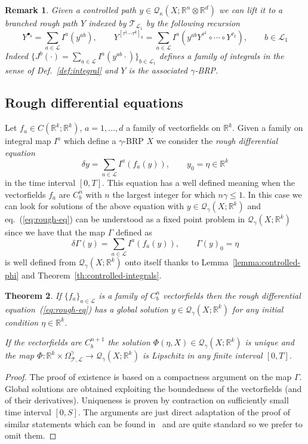 \documentclass[a4paper,11pt,reqno]{article}
\newcommand{\1}{{\bf 1}}
\newcommand{\der}{\delta}
\newcommand{\RR}{\mathbb{R}}
\newcommand{\QQ}{\mathcal{Q}}
\newcommand{\LL}{\mathcal{L}}
\newtheorem{theorem}{Theorem}[section]
\newtheorem{remark}[theorem]{Remark}
\newcommand{\TT}{\mathcal{T}}
\newcommand{\troot}{\bullet}
\begin{document}
\begin{remark}
Given a controlled path $y \in \QQ_\kappa(X;\RR^n\otimes \RR^d)$ we can lift it to  a branched rough path $Y$ indexed by $\TT_{\LL_1}$ by the following recursion
$$
Y^{\troot_b} = \sum_{a \in \LL} I^a(y^{ab}), \qquad
Y^{[\tau^1 \cdots \tau^k]_b} = \sum_{a \in \LL} I^a(y^{ab} Y^{\tau^1}\circ \cdots \circ  Y^{\tau_k}), \qquad b \in \LL_1 
$$  
Indeed $\{ J^b(\cdot) = \sum_{a\in\LL}I^a(y^{ab} \cdot)\}_{b \in \LL_1}$ defines a family  of integrals in the sense of Def.~\ref{def:integral} and $Y$ is the associated $\gamma$-BRP.
\end{remark}

\subsection{Rough differential equations}

Let $f_a \in C(\RR^k;\RR^k)$, $a=1,\dots,d$ a family of vectorfields on $\RR^k$. Given a family on integral map $I^a$ which define a $\gamma$-BRP $X$ we consider the \emph{rough differential equation}
\begin{equation}
  \label{eq:rough-eq}
\der y = \sum_{a\in\LL} I^a(f_a(y)), \qquad y_0 = \eta \in \RR^k  
\end{equation}
in the time interval $[0,T]$. This equation has a well defined meaning
when the vectorfields $f_a$ are $C^n_b$ with $n$ the largest integer
for which $n\gamma \le 1$. In this case we can look for solutions
of the above equation with $y \in \QQ_\gamma(X;\RR^k)$ and
eq.~(\ref{eq:rough-eq}) can be understood as a fixed point problem in
$\QQ_\gamma(X;\RR^k)$ since we have that the map $\Gamma$ defined as
$$
\der \Gamma(y) = \sum_{a\in\LL} I^a(f_a(y)), \qquad \Gamma(y)_0 = \eta
$$ 
is well defined from $\QQ_\gamma(X;\RR^k)$ onto itself thanks to
Lemma~\ref{lemma:controlled-phi} and  Theorem~\ref{th:controlled-integrals}.

\begin{theorem}
If $\{f_a\}_{a\in\LL}$ is a family of $C^{n}_b$ vectorfields then
the rough differential equation~(\ref{eq:rough-eq}) has a global
solution $y \in \QQ_\gamma(X;\RR^k)$  for any initial condition
$\eta\in\RR^k$.

 If the vectorfields are
$C^{n+1}_b$ the solution 
$\Phi(\eta,X)\in\QQ_\gamma(X;\RR^k)$ is unique and the map $\Phi: \RR^k \times \Omega^\gamma_{\TT,\LL} \to
\QQ_{\gamma}(X;\RR^k)$ is Lipschitz in any finite interval $[0,T]$.   
\end{theorem}
\begin{proof}
The proof of existence is based on a compactness argument on the map
$\Gamma$. Global solutions are obtained exploiting the boundedness of
the vectorfields (and of their derivatives). 
Uniqueness is proven by contraction on sufficiently small
time interval $[0,S]$.  The arguments are just direct adaptation of
the proof of similar statements which can be found in~\cite{MR2091358}
and are quite standard so we prefer to omit them.
\end{proof}
\end{document}

